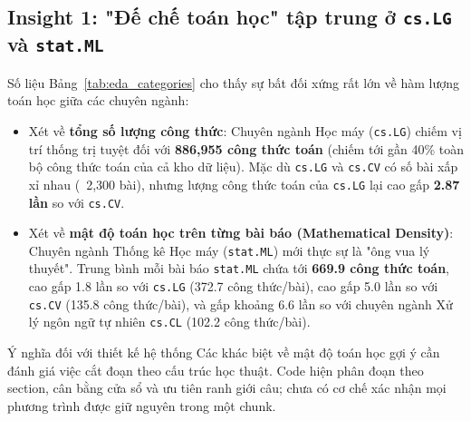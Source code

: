 \subsection{Insight 1: "Đế chế toán học" tập trung ở \texttt{cs.LG} và \texttt{stat.ML}}
Số liệu Bảng~\ref{tab:eda_categories} cho thấy sự bất đối xứng rất lớn về hàm lượng toán học giữa các chuyên ngành:
\begin{itemize}
  \item Xét về \textbf{tổng số lượng công thức}: Chuyên ngành Học máy (\texttt{cs.LG}) chiếm vị trí thống trị tuyệt đối với \textbf{886,955 công thức toán} (chiếm tới gần 40\% toàn bộ công thức toán của cả kho dữ liệu). Mặc dù \texttt{cs.LG} và \texttt{cs.CV} có số bài xấp xỉ nhau (~2,300 bài), nhưng lượng công thức toán của \texttt{cs.LG} lại cao gấp \textbf{2.87 lần} so với \texttt{cs.CV}.
  \item Xét về \textbf{mật độ toán học trên từng bài báo (Mathematical Density)}: Chuyên ngành Thống kê Học máy (\texttt{stat.ML}) mới thực sự là "ông vua lý thuyết". Trung bình mỗi bài báo \texttt{stat.ML} chứa tới \textbf{669.9 công thức toán}, cao gấp 1.8 lần so với \texttt{cs.LG} (372.7 công thức/bài), cao gấp 5.0 lần so với \texttt{cs.CV} (135.8 công thức/bài), và gấp khoảng 6.6 lần so với chuyên ngành Xử lý ngôn ngữ tự nhiên \texttt{cs.CL} (102.2 công thức/bài).
\end{itemize}

\begin{calloutbox}{Ý nghĩa đối với thiết kế hệ thống}
Các khác biệt về mật độ toán học gợi ý cần đánh giá việc cắt đoạn theo cấu trúc học thuật. Code hiện phân đoạn theo section, cân bằng cửa sổ và ưu tiên ranh giới câu; chưa có cơ chế xác nhận mọi phương trình được giữ nguyên trong một chunk.
\end{calloutbox}

